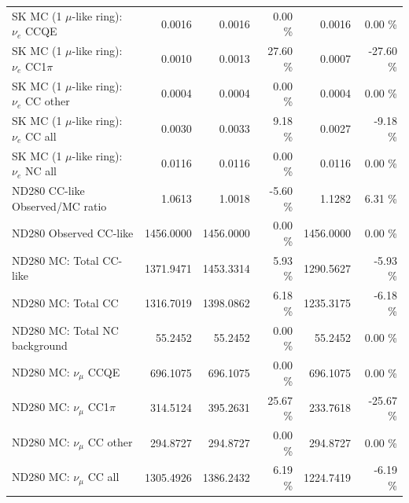 \begin{table}
\begin{tabular}{| l | r | r  r | r  r |}
                             SK MC (1 $\mu$-like ring): $\nu_{e}$ CCQE &          0.0016 &          0.0016 &  0.00 \%  &          0.0016 &  0.00 \%  \\ 
                         SK MC (1 $\mu$-like ring): $\nu_{e}$ CC1$\pi$ &          0.0010 &          0.0013 & 27.60 \%  &          0.0007 & -27.60 \%  \\ 
                         SK MC (1 $\mu$-like ring): $\nu_{e}$ CC other &          0.0004 &          0.0004 &  0.00 \%  &          0.0004 &  0.00 \%  \\ 
                           SK MC (1 $\mu$-like ring): $\nu_{e}$ CC all &          0.0030 &          0.0033 &  9.18 \%  &          0.0027 & -9.18 \%  \\ 
                           SK MC (1 $\mu$-like ring): $\nu_{e}$ NC all &          0.0116 &          0.0116 &  0.00 \%  &          0.0116 &  0.00 \%  \\ 
\hline
                                       ND280 CC-like Observed/MC ratio &          1.0613 &          1.0018 & -5.60 \%  &          1.1282 &  6.31 \%  \\ 
                                                ND280 Observed CC-like &       1456.0000 &       1456.0000 &  0.00 \%  &       1456.0000 &  0.00 \%  \\ 
                                               ND280 MC: Total CC-like &       1371.9471 &       1453.3314 &  5.93 \%  &       1290.5627 & -5.93 \%  \\ 
                                                    ND280 MC: Total CC &       1316.7019 &       1398.0862 &  6.18 \%  &       1235.3175 & -6.18 \%  \\ 
                                         ND280 MC: Total NC background &         55.2452 &         55.2452 &  0.00 \%  &         55.2452 &  0.00 \%  \\ 
\hline
                                            ND280 MC: $\nu_{\mu}$ CCQE &        696.1075 &        696.1075 &  0.00 \%  &        696.1075 &  0.00 \%  \\ 
                                        ND280 MC: $\nu_{\mu}$ CC1$\pi$ &        314.5124 &        395.2631 & 25.67 \%  &        233.7618 & -25.67 \%  \\ 
                                        ND280 MC: $\nu_{\mu}$ CC other &        294.8727 &        294.8727 &  0.00 \%  &        294.8727 &  0.00 \%  \\ 
                                          ND280 MC: $\nu_{\mu}$ CC all &       1305.4926 &       1386.2432 &  6.19 \%  &       1224.7419 & -6.19 \%  \\ 

\end{tabular}
\end{table}
